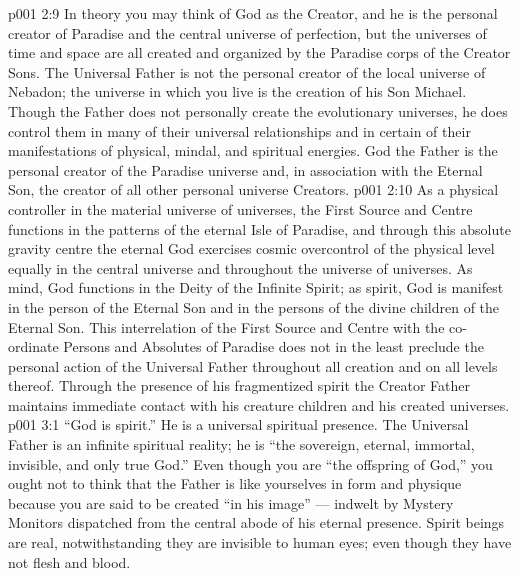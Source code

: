 \vs p001 2:9 \pc In theory you may think of God as the Creator, and he is the personal creator of Paradise and the central universe of perfection, but the universes of time and space are all created and organized by the Paradise corps of the Creator Sons. The Universal Father is not the personal creator of the local universe of Nebadon; the universe in which you live is the creation of his Son Michael. Though the Father does not personally create the evolutionary universes, he does control them in many of their universal relationships and in certain of their manifestations of physical, mindal, and spiritual energies. God the Father is the personal creator of the Paradise universe and, in association with the Eternal Son, the creator of all other personal universe Creators.
\vs p001 2:10 \pc As a physical controller in the material universe of universes, the First Source and Centre functions in the patterns of the eternal Isle of Paradise, and through this absolute gravity centre the eternal God exercises cosmic overcontrol of the physical level equally in the central universe and throughout the universe of universes. As mind, God functions in the Deity of the Infinite Spirit; as spirit, God is manifest in the person of the Eternal Son and in the persons of the divine children of the Eternal Son. This interrelation of the First Source and Centre with the co\hyp{}ordinate Persons and Absolutes of Paradise does not in the least preclude the  personal action of the Universal Father throughout all creation and on all levels thereof. Through the presence of his fragmentized spirit the Creator Father maintains immediate contact with his creature children and his created universes.
\vs p001 3:1 “God is spirit.” He is a universal spiritual presence. The Universal Father is an infinite spiritual reality; he is “the sovereign, eternal, immortal, invisible, and only true God.” Even though you are “the offspring of God,” you ought not to think that the Father is like yourselves in form and physique because you are said to be created “in his image” --- indwelt by Mystery Monitors dispatched from the central abode of his eternal presence. Spirit beings are real, notwithstanding they are invisible to human eyes; even though they have not flesh and blood.
